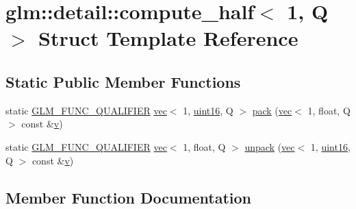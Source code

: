 \hypertarget{structglm_1_1detail_1_1compute__half_3_011_00_01_q_01_4}{}\section{glm\+:\+:detail\+:\+:compute\+\_\+half$<$ 1, Q $>$ Struct Template Reference}
\label{structglm_1_1detail_1_1compute__half_3_011_00_01_q_01_4}
\subsection*{Static Public Member Functions}
\begin{DoxyCompactItemize}
\item 
static \mbox{\hyperlink{setup_8hpp_a33fdea6f91c5f834105f7415e2a64407}{G\+L\+M\+\_\+\+F\+U\+N\+C\+\_\+\+Q\+U\+A\+L\+I\+F\+I\+ER}} \mbox{\hyperlink{structglm_1_1vec}{vec}}$<$ 1, \mbox{\hyperlink{namespaceglm_1_1detail_a47b2a7d006d187338e8031a352d1ce56}{uint16}}, Q $>$ \mbox{\hyperlink{structglm_1_1detail_1_1compute__half_3_011_00_01_q_01_4_adf3bd584754baf5ce34453bf4174a658}{pack}} (\mbox{\hyperlink{structglm_1_1vec}{vec}}$<$ 1, float, Q $>$ const \&\mbox{\hyperlink{_s_d_l__opengl_8h_a10a82eabcb59d2fcd74acee063775f90}{v}})
\item 
static \mbox{\hyperlink{setup_8hpp_a33fdea6f91c5f834105f7415e2a64407}{G\+L\+M\+\_\+\+F\+U\+N\+C\+\_\+\+Q\+U\+A\+L\+I\+F\+I\+ER}} \mbox{\hyperlink{structglm_1_1vec}{vec}}$<$ 1, float, Q $>$ \mbox{\hyperlink{structglm_1_1detail_1_1compute__half_3_011_00_01_q_01_4_a746beaa20b378bd4b7680b786c31e2c5}{unpack}} (\mbox{\hyperlink{structglm_1_1vec}{vec}}$<$ 1, \mbox{\hyperlink{namespaceglm_1_1detail_a47b2a7d006d187338e8031a352d1ce56}{uint16}}, Q $>$ const \&\mbox{\hyperlink{_s_d_l__opengl_8h_a10a82eabcb59d2fcd74acee063775f90}{v}})
\end{DoxyCompactItemize}


\subsection{Member Function Documentation}
\mbox{\label{structglm_1_1detail_1_1compute__half_3_011_00_01_q_01_4_adf3bd584754baf5ce34453bf4174a658}} 
